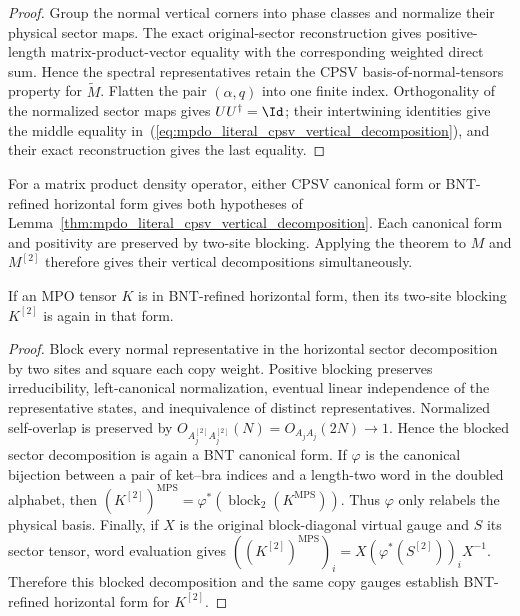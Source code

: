 \begin{proof}\leanok
    Group the normal vertical corners into phase classes and normalize their
    physical sector maps. The exact original-sector reconstruction gives
    positive-length matrix-product-vector equality with the corresponding
    weighted direct sum. Hence the spectral representatives retain the CPSV
    basis-of-normal-tensors property for $\widetilde M$. Flatten the pair
    $(\alpha,q)$ into one finite index. Orthogonality of the normalized sector
    maps gives $UU^\dagger=\Id$; their intertwining identities give the middle
    equality in~(\ref{eq:mpdo_literal_cpsv_vertical_decomposition}), and their
    exact reconstruction gives the last equality.
\end{proof}

For a matrix product density operator, either CPSV canonical form
or BNT-refined horizontal form gives both hypotheses of
Lemma~\ref{thm:mpdo_literal_cpsv_vertical_decomposition}.
Each canonical form and positivity are preserved by two-site blocking.
Applying the theorem to $M$ and $M^{[2]}$ therefore gives their vertical
decompositions simultaneously.

\begin{lemma}
    \label{lem:mpdo_horizontal_cf_block_two}
    \leanok
    If an MPO tensor $K$ is in BNT-refined horizontal form, then its
    two-site blocking $K^{[2]}$ is again in that form.
\end{lemma}

\begin{proof}
    \leanok
    Block every normal representative in the horizontal sector decomposition
    by two sites and square each copy weight. Positive blocking preserves
    irreducibility, left-canonical normalization, eventual linear
    independence of the representative states, and inequivalence of distinct
    representatives. Normalized self-overlap is preserved by
    $O_{A_j^{[2]}A_j^{[2]}}(N)=O_{A_jA_j}(2N)\longrightarrow1$.
    Hence the blocked sector decomposition is again a BNT canonical form. If
    $\varphi$ is the canonical bijection between a pair of ket--bra indices
    and a length-two word in the doubled alphabet, then
    $(K^{[2]})^{\mathrm{MPS}}=\varphi^*\!\left(\operatorname{block}_2(K^{\mathrm{MPS}})\right)$.
    Thus $\varphi$ only relabels the physical basis. Finally, if $X$ is the
    original block-diagonal virtual gauge and $S$ its sector tensor, word
    evaluation gives $((K^{[2]})^{\mathrm{MPS}})_i=X(\varphi^*(S^{[2]}))_iX^{-1}$.
    Therefore this blocked decomposition and the same copy gauges establish
    BNT-refined horizontal form for $K^{[2]}$.
\end{proof}

